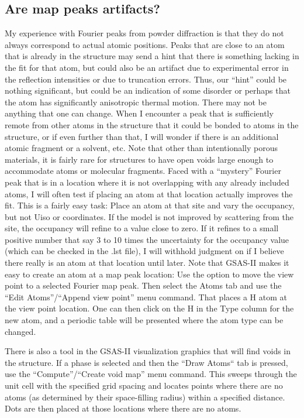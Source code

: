 \subsection{Are map peaks artifacts?}
My experience with Fourier peaks from powder diffraction is that they do not always correspond to actual atomic positions. Peaks that are close to an atom that is already in the structure may send a hint that there is something lacking in the fit for that atom, but could also be an artifact due to experimental error in the reflection intensities or due to truncation errors. Thus, our ``hint'' could be nothing significant, but could be an indication of some disorder or perhaps that the atom has significantly anisotropic thermal motion. There may not be anything that one can change. When I encounter a peak that is sufficiently remote from other atoms in the structure that it could be bonded to atoms in the structure, or if even further than that, I will wonder if there is an additional atomic fragment or a solvent, etc. Note that other than intentionally porous materials, it is fairly rare for structures to have open voids large enough to accommodate atoms or molecular fragments. Faced with a ``mystery'' Fourier peak that is in a location where it is not overlapping with any already included atoms, I will often test if placing an atom at that location actually improves the fit. This is a fairly easy task: Place an atom at that site and vary the occupancy, but not Uiso or coordinates. If the model is not improved by scattering from the site, the occupancy will refine to a value close to zero. If it refines to a small positive number that say 3 to 10 times the uncertainty for the occupancy value (which can be checked in the .lst file), I will withhold judgment on if I believe there really is an atom at that location until later. Note that GSAS-II makes it easy to create an atom at a map peak location:  Use the option to move the view point to a selected Fourier map peak. Then select the Atoms tab and use the ``Edit Atoms''/``Append view point'' menu command. That places a H atom at the view point location. One can then click on the H in the Type column for the new atom, and a periodic table will be presented where the atom type can be changed. 

There is also a tool in the GSAS-II visualization graphics that will find
voids in the structure. If a phase is selected and then the ``Draw Atoms`` tab is pressed, use the ``Compute''/``Create void map'' menu command. This 
sweeps through the unit cell with the specified grid spacing and locates points where there are no atoms (as determined by their space-filling radius) within a specified distance. Dots are then placed at those locations where there are no atoms.
    
